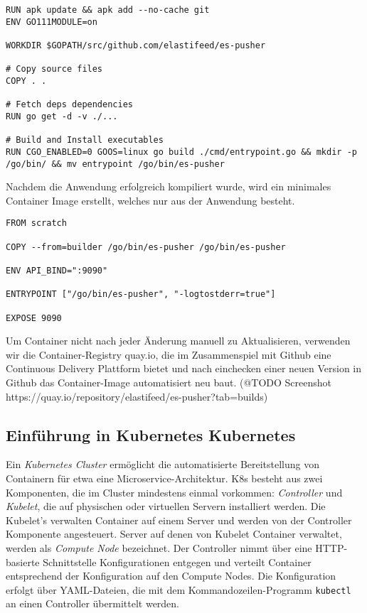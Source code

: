 \begin{lstlisting}
RUN apk update && apk add --no-cache git
ENV GO111MODULE=on

WORKDIR $GOPATH/src/github.com/elastifeed/es-pusher

# Copy source files
COPY . .

# Fetch deps dependencies
RUN go get -d -v ./...

# Build and Install executables
RUN CGO_ENABLED=0 GOOS=linux go build ./cmd/entrypoint.go && mkdir -p /go/bin/ && mv entrypoint /go/bin/es-pusher
\end{lstlisting}

Nachdem die Anwendung erfolgreich kompiliert wurde, wird ein minimales Container Image erstellt, welches nur aus der Anwendung besteht.

\begin{lstlisting}
FROM scratch

COPY --from=builder /go/bin/es-pusher /go/bin/es-pusher

ENV API_BIND=":9090"

ENTRYPOINT ["/go/bin/es-pusher", "-logtostderr=true"]

EXPOSE 9090
\end{lstlisting}

Um Container nicht nach jeder Änderung manuell zu Aktualisieren, verwenden wir die Container-Registry quay.io, die im Zusammenspiel mit Github eine Continuous Delivery Plattform bietet und nach einchecken einer neuen Version in Github das Container-Image automatisiert neu baut. (@TODO Screenshot https://quay.io/repository/elastifeed/es-pusher?tab=builds)

\subsection{Einführung in Kubernetes Kubernetes}

Ein \textit{Kubernetes Cluster} \cite{k8s} ermöglicht die automatisierte Bereitstellung von Containern für etwa eine Microservice-Architektur.
K8s besteht aus zwei Komponenten, die im Cluster mindestens einmal vorkommen: \textit{Controller} und \textit{Kubelet}, die auf physischen oder virtuellen Servern installiert werden.
Die Kubelet's verwalten Container auf einem Server und werden von der Controller Komponente angesteuert.
Server auf denen von Kubelet Container verwaltet, werden als \textit{Compute Node} bezeichnet.
Der Controller nimmt über eine HTTP-basierte Schnittstelle Konfigurationen entgegen und verteilt Container entsprechend der Konfiguration auf den Compute Nodes.
Die Konfiguration erfolgt über YAML-Dateien, die mit dem Kommandozeilen-Programm \texttt{kubectl} an einen Controller übermittelt werden.

